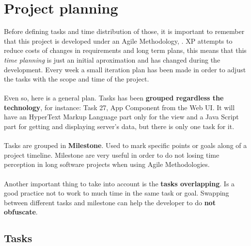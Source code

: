 
\chapter{Project planning}

\label{chapter09}

Before defining tasks and time distribution of those, it is important to remember that this project is developed under an Agile Methodology, . XP attempts to reduce costs of changes in requirements and long term plans, this means that this \textit{time planning} is just an initial aproximation and has changed during the development. Every week a small iteration plan has been made in order to adjust the tasks with the scope and time of the project.
\\\\
Even so, here is a general plan. Tasks has been \textbf{grouped regardless the technology}, for instance\cite{w3_templates}: Task 27, App Component from the Web UI. It will have an HyperText Markup Language part only for the view and a Java Script part for getting and displaying server's data, but there is only one task for it.
\\\\
Tasks are grouped in \textbf{Milestone}. Used to mark specific points or goals along of a project timeline. Milestone are very useful in order to do not losing time perception in long software projects when using Agile Methodologies.
\\\\
Another important thing to take into account is the \textbf{tasks overlapping}. Is a good practice\cite{clean_coder} not to work to much time in the same task or goal. Swapping between different tasks and milestone can help the developer to do \textbf{not obfuscate}.


\section{Tasks}

